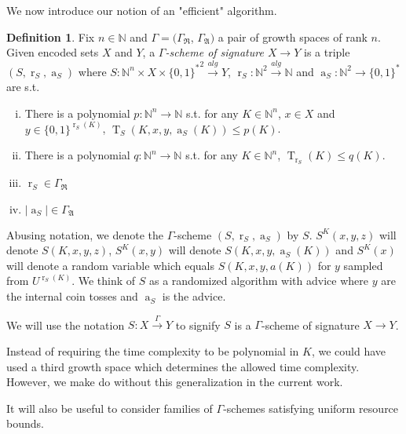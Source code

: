 \documentclass{article}
\theoremstyle{definition}
\newtheorem{definition}{Definition}[section]
\theoremstyle{plain}
\newcommand{\Words}{{\{ 0, 1 \}^*}}
\newcommand{\WordsLen}[1]{{\{ 0, 1 \}^{#1}}}
\DeclareMathOperator{\T}{T}
\DeclareMathOperator{\R}{r}
\DeclareMathOperator{\A}{a}
\newcommand{\Nats}{\mathbb{N}}
\newcommand{\Abs}[1]{\lvert #1 \rvert}
\begin{document}
We now introduce our notion of an "efficient" algorithm.

\begin{definition}

Fix $n \in \Nats$ and $\Gamma=(\Gamma_{\mathfrak{R}}$, $\Gamma_{\mathfrak{A}})$ a pair of growth spaces of rank $n$. Given encoded sets $X$ and $Y$, a \emph{$\Gamma$-scheme of signature $X \rightarrow Y$} is a triple $(S,\R_S,\A_S)$ where $S: \Nats^n \times X \times \Words^2 \xrightarrow{alg} Y$, $\R_S: \Nats^2 \xrightarrow{alg} \Nats$ and $\A_S: \Nats^2 \rightarrow \Words$ are s.t.

\begin{enumerate}[(i)]

\item There is a polynomial $p: \Nats^n \rightarrow \Nats$ s.t. for any $K \in \Nats^n$, $x \in X$ and $y \in \WordsLen{\R_S(K)}$, $\T_S(K,x,y,\A_S(K)) \leq p(K)$.

\item There is a polynomial $q: \Nats^n \rightarrow \Nats$ s.t. for any $K \in \Nats^n$, $\T_{\R_S}(K) \leq q(K)$.

\item $\R_S \in \Gamma_{\mathfrak{R}}$

\item $\Abs{\A_S} \in \Gamma_{\mathfrak{A}}$

\end{enumerate}

Abusing notation, we denote the $\Gamma$-scheme $(S,\R_S,\A_S)$ by $S$. $S^K(x,y,z)$ will denote $S(K,x,y,z)$, $S^K(x,y)$ will denote $S(K,x,y,\A_S(K))$ and $S^K(x)$ will denote a random variable which equals $S(K,x,y,a(K))$ for $y$ sampled from $U^{\R_S(K)}$. We think of $S$ as a randomized algorithm with advice where $y$ are the internal coin tosses and $\A_S$ is the advice.

We will use the notation $S: X \xrightarrow{\Gamma} Y$ to signify $S$ is a $\Gamma$-scheme of signature $X \rightarrow Y$.

\end{definition}

Instead of requiring the time complexity to be polynomial in $K$, we could have used a third growth space which determines the allowed time complexity. However, we make do without this generalization in the current work.

It will also be useful to consider families of $\Gamma$-schemes satisfying uniform resource bounds.
\end{document}
